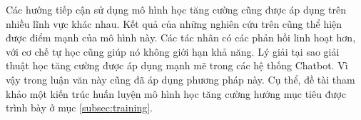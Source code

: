 Các hướng tiếp cận sử dụng mô hình học tăng cường cũng được áp dụng trên nhiều lĩnh vực khác nhau. Kết quả của những nghiên cứu trên cũng thể hiện được điểm mạnh của mô hình này. Các tác nhân có các phản hồi linh hoạt hơn, với cơ chế tự học cũng giúp nó không giới hạn khả năng. Lý giải tại sao giải thuật học tăng cường được áp dụng mạnh mẽ trong các hệ thống Chatbot. Vì vậy trong luận văn này cũng đã áp dụng phương pháp này. Cụ thể, đề tài tham khảo một kiến trúc huấn luyện mô hình học tăng cường hướng mục tiêu được trình bày ở mục \ref{subsec:training}.
